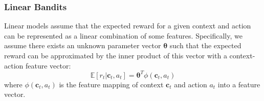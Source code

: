 
\subsubsection{Linear Bandits}
Linear models assume that the expected reward for a given context and action can be represented as a linear combination of some features. Specifically, we assume there exists an unknown parameter vector $\boldsymbol{\theta}$ such that the expected reward can be approximated by the inner product of this vector with a context-action feature vector:
\begin{equation*}
    \mathbb{E}[r_t  \vert  \mathbf{c}_t, a_t] = \boldsymbol{\theta}^T \phi(\mathbf{c}_t, a_t)
\end{equation*}
where $\phi(\mathbf{c}_t, a_t)$ is the feature mapping of context $\mathbf{c}_t$ and action $a_t$ into a feature vector.


